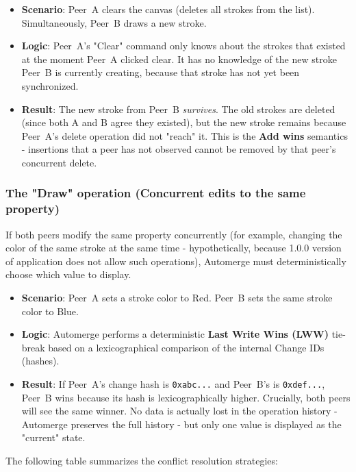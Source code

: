 \documentclass[a4paper,11pt,twoside]{report}
\theoremstyle{definition}
\begin{document}
\begin{itemize}
    \item \textbf{Scenario}: Peer~A clears the canvas (deletes all strokes from the list). 
    Simultaneously, Peer~B draws a new stroke.
    \item \textbf{Logic}: Peer~A's "Clear" command only knows about the strokes that existed 
    at the moment Peer~A clicked clear. It has no knowledge of the new stroke Peer~B is 
    currently creating, because that stroke has not yet been synchronized.
    \item \textbf{Result}: The new stroke from Peer~B \emph{survives}. The old strokes are 
    deleted (since both A and B agree they existed), but the new stroke remains because 
    Peer~A's delete operation did not "reach" it. This is the \textbf{Add wins} semantics 
    - insertions that a peer has not observed cannot be removed by that peer's concurrent 
    delete.
\end{itemize}

\subsubsection*{The "Draw" operation (Concurrent edits to the same property)}

If both peers modify the same property concurrently (for example, changing the color of the 
same stroke at the same time - hypothetically, because 1.0.0 version of application does not allow 
such operations), Automerge must deterministically choose which value to display.

\begin{itemize}
    \item \textbf{Scenario}: Peer~A sets a stroke color to Red. Peer~B sets the same stroke 
    color to Blue.
    \item \textbf{Logic}: Automerge performs a deterministic \textbf{Last Write Wins (LWW)} 
    tie-break based on a lexicographical comparison of the internal Change IDs (hashes).
    \item \textbf{Result}: If Peer~A's change hash is \texttt{0xabc...} and Peer~B's is 
    \texttt{0xdef...}, Peer~B wins because its hash is lexicographically higher. Crucially, 
    both peers will see the same winner. No data is actually lost in the operation history 
    - Automerge preserves the full history - but only one value is displayed as the 
    "current" state.
\end{itemize}

The following table summarizes the conflict resolution strategies:
\end{document}
